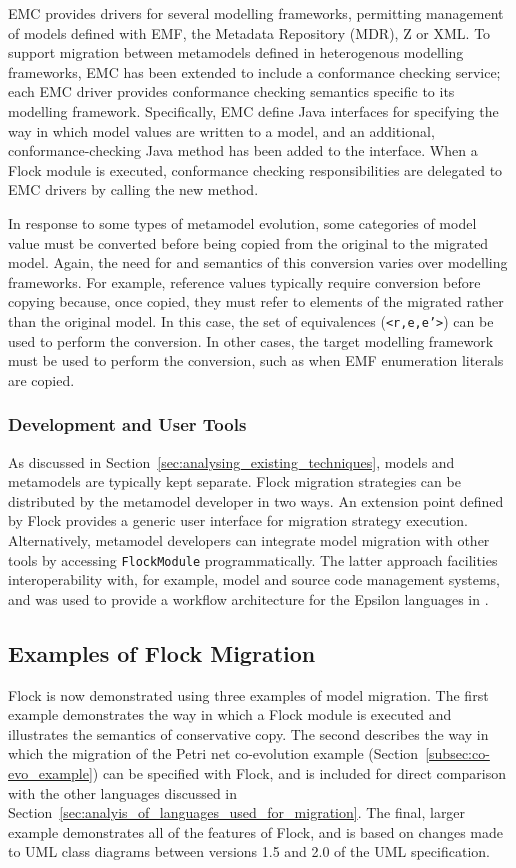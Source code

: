 EMC provides drivers for several modelling frameworks, permitting management of models defined with EMF, the Metadata Repository (MDR), Z or XML. To support migration between metamodels defined in heterogenous modelling frameworks, EMC has been extended to include a conformance checking service; each EMC driver provides conformance checking semantics specific to its modelling framework. Specifically, EMC define Java interfaces for specifying the way in which model values are written to a model, and an additional, conformance-checking Java method has been added to the interface. When a Flock module is executed, conformance checking responsibilities are delegated to EMC drivers by calling the new method. 

In response to some types of metamodel evolution, some categories of model value must be converted before being copied from the original to the migrated model. Again, the need for and semantics of this conversion varies over modelling frameworks. For example, reference values typically require conversion before copying because, once copied, they must refer to elements of the migrated rather than the original model. In this case, the set of equivalences (\texttt{<r,e,e'>}) can be used to perform the conversion. In other cases, the target modelling framework must be used to perform the conversion, such as when EMF enumeration literals are copied.

 
\subsubsection{Development and User Tools}
As discussed in Section~\ref{sec:analysing_existing_techniques}, models and metamodels are typically kept separate. Flock migration strategies can be distributed by the metamodel developer in two ways. An extension point defined by Flock provides a generic user interface for migration strategy execution. Alternatively, metamodel developers can integrate model migration with other tools by accessing \texttt{FlockModule} programmatically. The latter approach facilities interoperability with, for example, model and source code management systems, and was used to provide a workflow architecture for the Epsilon languages in \cite{kolovos09thesis}.


\subsection{Examples of Flock Migration}
\label{subsec:flock_examples}
Flock is now demonstrated using three examples of model migration. The first example demonstrates the way in which a Flock module is executed and illustrates the semantics of conservative copy. The second describes the way in which the migration of the Petri net co-evolution example (Section~\ref{subsec:co-evo_example}) can be specified with Flock, and is included for direct comparison with the other languages discussed in Section~\ref{sec:analyis_of_languages_used_for_migration}. The final, larger example demonstrates all of the features of Flock, and is based on changes made to UML class diagrams between versions 1.5 and 2.0 of the UML specification.

